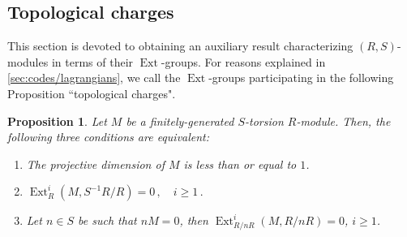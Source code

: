 \documentclass[sn-mathphys-num]{sn-jnl}
\newtheorem{proposition}[lemma]{Proposition}
\theoremstyle{definition}
\numberwithin{equation}{section}
\theoremstyle{definition}
\def\ext{\operatorname{Ext}}
\begin{document}
\subsection{Topological charges}\label{sec:top_charges}

This section is devoted to obtaining an auxiliary result characterizing  $(R,S)$-modules in terms of their $\ext$-groups. For reasons explained in \ref{sec:codes/lagrangians}, we call the $\ext$-groups participating in the following Proposition ``topological charges". 

\begin{proposition}\label{prop:top_charges}
    Let $M$ be a finitely-generated $S$-torsion $R$-module. Then, the following three conditions are equivalent: 
    \begin{enumerate}
    \item The projective dimension of $M$ is less than or equal to $1$.
    \item $\ext_{R}^i(M,S^{-1}R/R)=0\,,\quad i\geqslant1\,.$
        \item Let $n\in S$ be such that $nM=0$, then $\ext_{R/nR}^i(M,R/nR)=0$, $i\geqslant 1$.
    \end{enumerate}
\end{proposition}
\end{document}
